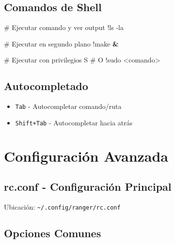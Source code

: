 \documentclass[
  doc,
  floatsintext,
  longtable,
  a4paper,
  nolmodern,
  notxfonts,
  notimes,
  12pt,
  colorlinks=true,linkcolor=blue,citecolor=blue,urlcolor=blue]{apa7}
\newenvironment{Shaded}{\begin{snugshade}}{\end{snugshade}}
\newcommand{\AttributeTok}[1]{\textcolor[rgb]{0.40,0.45,0.13}{#1}}
\newcommand{\CommentTok}[1]{\textcolor[rgb]{0.37,0.37,0.37}{#1}}
\newcommand{\ExtensionTok}[1]{\textcolor[rgb]{0.00,0.23,0.31}{#1}}
\newcommand{\KeywordTok}[1]{\textcolor[rgb]{0.00,0.23,0.31}{\textbf{#1}}}
\newcommand{\NormalTok}[1]{\textcolor[rgb]{0.00,0.23,0.31}{#1}}
\newcommand{\OperatorTok}[1]{\textcolor[rgb]{0.37,0.37,0.37}{#1}}
\providecommand{\tightlist}{%
  \setlength{\itemsep}{0pt}\setlength{\parskip}{0pt}}
\begin{document}
\subsection{Comandos de Shell}\label{comandos-de-shell}

\begin{Shaded}
\begin{Highlighting}[]
\CommentTok{\# Ejecutar comando y ver output}
\ExtensionTok{!ls} \AttributeTok{{-}la}

\CommentTok{\# Ejecutar en segundo plano}
\ExtensionTok{!make} \KeywordTok{\&}

\CommentTok{\# Ejecutar con privilegios}
\ExtensionTok{S}
\CommentTok{\# O}
\ExtensionTok{!sudo} \OperatorTok{\textless{}}\NormalTok{comando}\OperatorTok{\textgreater{}}
\end{Highlighting}
\end{Shaded}

\subsection{Autocompletado}\label{autocompletado}

\begin{itemize}
\tightlist
\item
  \texttt{Tab} - Autocompletar comando/ruta
\item
  \texttt{Shift+Tab} - Autocompletar hacia atrás
\end{itemize}

\section{Configuración Avanzada}\label{configuraciuxf3n-avanzada}

\subsection{rc.conf - Configuración
Principal}\label{rc.conf---configuraciuxf3n-principal}

Ubicación: \texttt{\textasciitilde{}/.config/ranger/rc.conf}

\subsection{Opciones Comunes}\label{opciones-comunes}
\end{document}
